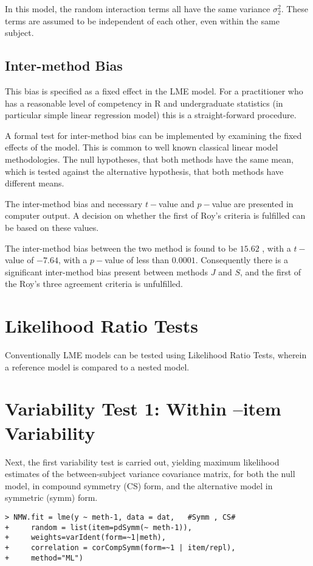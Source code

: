 \documentclass[12pt, a4paper]{report}
\theoremstyle{plain}
\theoremstyle{definition}
\theoremstyle{remark}
\begin{document}
In this model, the random interaction terms all have the same variance $\sigma^2_{2}$. These terms are assumed to be independent of each other, even
within the same subject.

\newpage
\subsection{Inter-method Bias}
This bias is specified as a fixed effect in the LME model.  For a practitioner who has a reasonable level of competency in R and undergraduate statistics (in particular simple linear regression model) this is a straight-forward procedure.

A formal test for inter-method bias can be implemented by examining the fixed effects of the model. This is common to well known classical linear model methodologies. The null hypotheses, that both methods have the same mean, which is tested against the alternative hypothesis, that both methods have different means.

The inter-method bias and necessary $t-$value and $p-$value are presented in computer output. A decision on whether the first of Roy's criteria is fulfilled can be based on these values.


The inter-method bias between the two method is found to be $15.62$ , with a $t-$value of $-7.64$, with a $p-$value of less than $0.0001$. Consequently there is a significant inter-method bias present between methods $J$ and $S$, and the first of the Roy's three agreement criteria is unfulfilled.

\section{Likelihood Ratio Tests}
Conventionally LME models can be tested using Likelihood Ratio Tests, wherein a reference model is compared to a nested model.


\newpage
\section{Variability Test 1: Within –item Variability}


Next, the first variability test is carried out, yielding maximum likelihood estimates of the between-subject variance covariance matrix, for both the null model, in compound symmetry (CS) form, and the alternative model in symmetric (symm) form. 
\begin{framed}
\begin{verbatim}
> NMW.fit = lme(y ~ meth-1, data = dat,   #Symm , CS# 
+     random = list(item=pdSymm(~ meth-1)),
+     weights=varIdent(form=~1|meth), 
+     correlation = corCompSymm(form=~1 | item/repl), 
+     method="ML")
\end{verbatim}
\end{framed}
\end{document}
